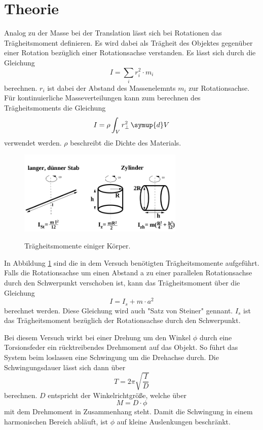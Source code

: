 \section{Theorie}
\label{sec:Theorie}
Analog zu der Masse bei der Translation lässt sich bei Rotationen das Trägheitsmoment definieren. Es wird dabei als Trägheit des Objektes gegenüber einer Rotation bezüglich einer Rotationsachse verstanden. Es lässt sich durch die Gleichung 
\begin{equation}
    I=\sum_{i}r_i^2\cdot m_i
\end{equation}
berechnen. $r_i$ ist dabei der Abstand des Massenelemnts $m_i$ zur Rotationsachse.
Für kontinuierliche Masseverteilungen kann zum berechnen des Trägheitsmoments die Gleichung
\begin{equation}
    I=\rho\int_V r_\perp^2 \,\symup{d}V
\end{equation}
verwendet werden. $\rho$ beschreibt die Dichte des Materials.


\begin{figure}
    \caption{Trägheitsmomente einiger Körper.}
    \centering
    \includegraphics[height=4cm]{data/Probekoerper.png}
    \label{fig:probe}
\end{figure}


In Abbildung \ref{fig:probe} sind die in dem Versuch benötigten Trägheitsmomente aufgeführt. 
Falls die Rotationsachse um einen Abstand a zu einer parallelen Rotationsachse durch den Schwerpunkt verschoben ist, kann das Trägheitsmoment über die Gleichung
\begin{equation}
\label{eqn:stein}
    I=I_s+m\cdot a^2
\end{equation}
berechnet werden. Diese Gleichung wird auch "Satz von Steiner" gennant.  $I_s$ ist das Trägheitsmoment bezüglich der Rotationsachse durch den Schwerpunkt.


Bei diesem Versuch wirkt bei einer Drehung um den Winkel $\phi$ durch eine Torsionsfeder ein rücktreibendes Drehmoment auf das Objekt. So führt das System beim loslassen eine Schwingung um die Drehachse durch. Die Schwingungsdauer lässt sich dann über 
\begin{equation}
\label{eqn:T}
    T=2\pi \sqrt{\frac{I}{D}}
\end{equation}
berechnen. $D$ entspricht der Winkelrichtgröße, welche über  
\begin{equation}
\label{eqn:M}
    M=D\cdot \phi
\end{equation}
mit dem Drehmoment in Zusammenhang steht.
Damit die Schwingung in einem harmonischen Bereich abläuft, ist $\phi$ auf kleine Auslenkungen beschränkt.


